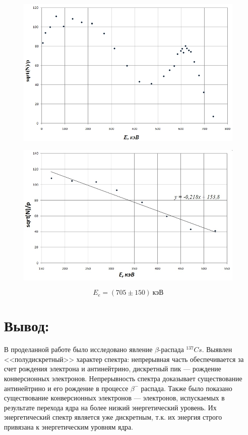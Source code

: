 \documentclass[a4paper,12pt]{article}
\theoremstyle{plain} %
\theoremstyle{definition} %
\theoremstyle{remark} %
\begin{document}
\begin{figure}[h!]
	\centering
	\includegraphics[width=0.9\linewidth]{gr1}
\end{figure}

\begin{figure}[h!]
	\centering
	\includegraphics[width=0.9\linewidth]{gr2}
\end{figure}

\newpage
$$E_e = (705 \pm 150)~\text{кэВ}$$

\vspace{-10pt}
\section*{Вывод:}   В проделанной работе было исследовано явление $\beta$-распада $^{137}Cs$. Выявлен <<полудискретный>> характер спектра: непрерывная часть обеспечивается за счет рождения электрона и антинейтрино, дискретный пик --- рождение конверсионных электронов. Непрерывность спектра доказывает существование антинейтрино и его рождение в процессе $\beta^-$ распада. Также было показано существование конверсионных электронов --- электронов, испускаемых в результате перехода ядра на более низкий энергетический уровень. Их энергетический спектр является уже дискретным, т.к. их энергия строго привязана к энергетическим уровням ядра.
\end{document}
